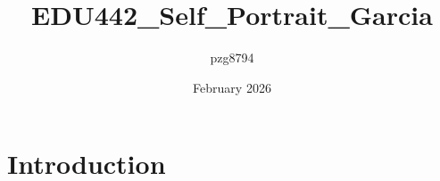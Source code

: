 \documentclass{article}
\title{EDU442_Self_Portrait_Garcia}
\author{pzg8794 }
\date{February 2026}
\begin{document}
\maketitle

\section{Introduction}
\end{document}

